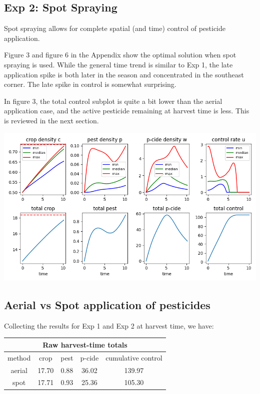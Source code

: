 \documentclass[11pt]{article}
\begin{document}
\subsection{Exp 2: Spot Spraying}

Spot spraying allows for complete spatial (and time) control of pesticide application.

Figure 3 and figure 6 in the Appendix show the optimal solution when spot spraying is used. While the general time trend is similar to Exp 1, the late application spike is both later in the season and concentrated in the southeast corner. The late spike in control is somewhat surprising.

In figure 3, the total control subplot is quite a bit lower than the aerial application case, and the active pesticide remaining at harvest time is less. This is reviewed in the next section.

\begin{minipage}{\textwidth}
	\begin{center}
		\includegraphics[width=0.8\linewidth]{../scp_240604-085334/time.png}
	\end{center}
\end{minipage}

\subsection{Aerial vs Spot application of pesticides}

Collecting the results for Exp 1 and Exp 2 at harvest time, we have:

\begin{center}
	\begin{tabular}{ | c | c | c| c| c| }
	\hline
	\multicolumn{5}{|c|}{Raw harvest-time totals} \\
	\hline
    method & crop & pest & p-cide & cumulative control \\
    \hline
    aerial & 17.70 & 0.88 & 36.02 & 139.97 \\
    \hline
    spot & 17.71 & 0.93 & 25.36 & 105.30 \\
    \hline
    \end{tabular}
\end{center}
\end{document}
